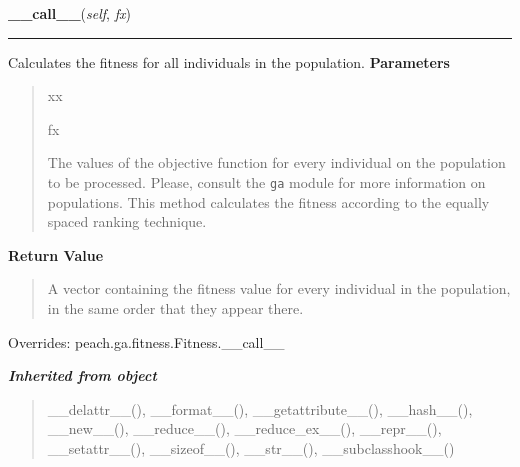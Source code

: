 \hspace{.8\funcindent}\begin{boxedminipage}{\funcwidth}

    \raggedright \textbf{\_\_call\_\_}(\textit{self}, \textit{fx})

    \vspace{-1.5ex}

    \rule{\textwidth}{0.5\fboxrule}
\setlength{\parskip}{2ex}

Calculates the fitness for all individuals in the population.
\setlength{\parskip}{1ex}
      \textbf{Parameters}
      \vspace{-1ex}

      \begin{quote}
        \begin{Ventry}{xx}

          \item[fx]


The values of the objective function for every individual on the
population to be processed. Please, consult the \texttt{ga} module for
more information on populations. This method calculates the fitness
according to the equally spaced ranking technique.
        \end{Ventry}

      \end{quote}

      \textbf{Return Value}
    \vspace{-1ex}

      \begin{quote}

A vector containing the fitness value for every individual in the
population, in the same order that they appear there.
      \end{quote}

      Overrides: peach.ga.fitness.Fitness.\_\_call\_\_

    \end{boxedminipage}


\large{\textbf{\textit{Inherited from object}}}

\begin{quote}
\_\_delattr\_\_(), \_\_format\_\_(), \_\_getattribute\_\_(), \_\_hash\_\_(), \_\_new\_\_(), \_\_reduce\_\_(), \_\_reduce\_ex\_\_(), \_\_repr\_\_(), \_\_setattr\_\_(), \_\_sizeof\_\_(), \_\_str\_\_(), \_\_subclasshook\_\_()
\end{quote}


